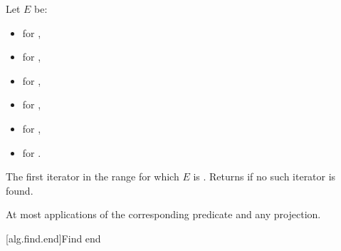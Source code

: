\begin{itemdescr}
\pnum
Let $E$ be:
\begin{itemize}
\item {} for ,
\item {} for ,
\item {} for ,
\item {} for ,
\item {} for ,
\item {} for .
\end{itemize}

\pnum
\returns
The first iterator
in the range
for which
$E$ is .
Returns  if no such iterator is found.

\pnum
\complexity
At most
applications of the corresponding predicate and any projection.
\end{itemdescr}

[alg.find.end]{Find end}

